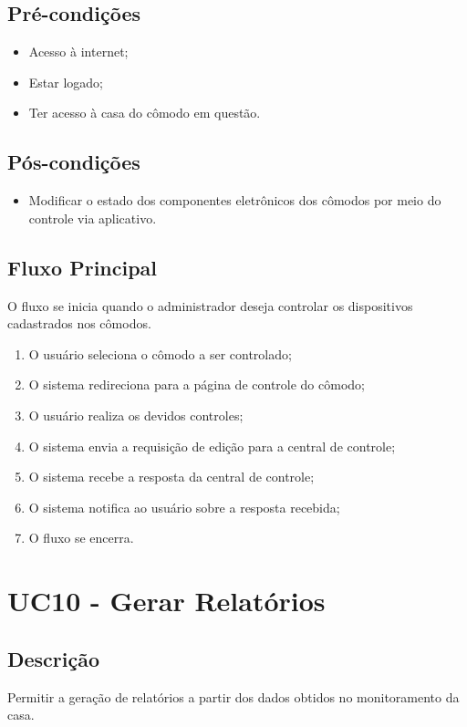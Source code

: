 \begin{anexosenv}
    \subsection{Pré-condições}
        \begin{itemize}
            \item Acesso à internet;
            \item Estar logado;
            \item Ter acesso à casa do cômodo em questão.
        \end{itemize}
    \subsection{Pós-condições}
        \begin{itemize}
            \item Modificar o estado dos componentes eletrônicos dos cômodos por meio do controle via aplicativo.
        \end{itemize}
    \subsection{Fluxo Principal}
        O fluxo se inicia quando o administrador deseja controlar os dispositivos cadastrados nos cômodos.
        \begin{enumerate}
            \item O usuário seleciona o cômodo a ser controlado;
            \item O sistema redireciona para a página de controle do cômodo;
            \item O usuário realiza os devidos controles;
            \item O sistema envia a requisição de edição para a central de controle;
            \item O sistema recebe a resposta da central de controle;
            \item O sistema notifica ao usuário sobre a resposta recebida;
            \item O fluxo se encerra.
        \end{enumerate}

\section{UC10 \-- Gerar Relatórios}
    \subsection{Descrição}
        Permitir a geração de relatórios a partir dos dados obtidos no monitoramento da casa.

\end{anexosenv}
